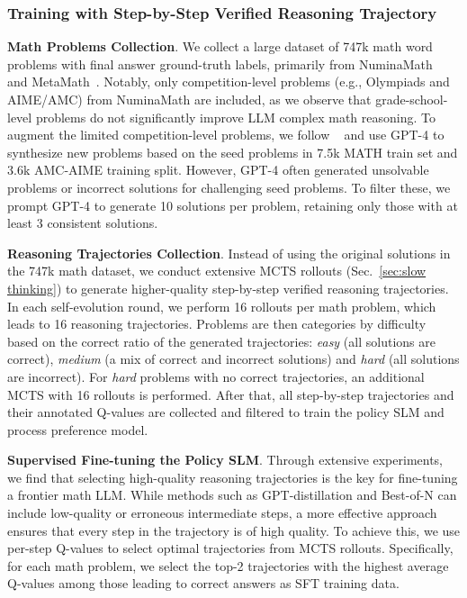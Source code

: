 \subsubsection{Training with Step-by-Step Verified Reasoning Trajectory}
\vspace{-1ex}
\noindent\textbf{Math Problems Collection}. We collect a large dataset of 747k math word problems with final answer ground-truth labels, primarily from  NuminaMath~\citep{numina_math_datasets} and MetaMath~\citep{yu2023metamath}. Notably, only competition-level problems (e.g., Olympiads and AIME/AMC) from NuminaMath are included, as we  observe that  grade-school-level problems do not significantly improve LLM complex math reasoning. To augment the limited  competition-level problems, we follow ~\citep{xwin} and use GPT-4 to synthesize new problems based on the seed problems in 7.5k MATH train set and 3.6k AMC-AIME training split.  However, GPT-4 often generated unsolvable problems or incorrect solutions for challenging seed problems. To filter these, we prompt GPT-4 to generate 10 solutions per problem, retaining only those with at least 3 consistent solutions. %

\noindent\textbf{Reasoning Trajectories Collection}. Instead of using the original solutions in the 747k math dataset, we conduct extensive MCTS rollouts (Sec.~\ref{sec:slow thinking}) to generate higher-quality step-by-step verified reasoning trajectories.  In each self-evolution round,   we perform 16 rollouts per math problem, which leads to 16 reasoning trajectories. Problems are then categories by difficulty based on the correct ratio of the generated trajectories:  \textit{easy} (all solutions are correct), \textit{medium} (a mix of correct and incorrect solutions) and \textit{hard} (all solutions are incorrect). For \textit{hard}  problems with no correct trajectories, an additional MCTS with 16 rollouts is performed.  After that, all step-by-step trajectories and their annotated Q-values are collected and filtered to train the policy SLM and process preference model.

\noindent\textbf{Supervised Fine-tuning the Policy SLM}.  Through extensive experiments, we find that selecting high-quality reasoning trajectories is the key for fine-tuning a frontier math LLM. While  methods such as  GPT-distillation and Best-of-N can include low-quality or erroneous intermediate steps, a more effective approach ensures that every step in the trajectory is of high quality. To achieve this, we use per-step Q-values to select optimal trajectories from MCTS rollouts. Specifically, for each math problem, we select the top-2 trajectories with the highest average Q-values among those leading to  correct answers as SFT training data.



